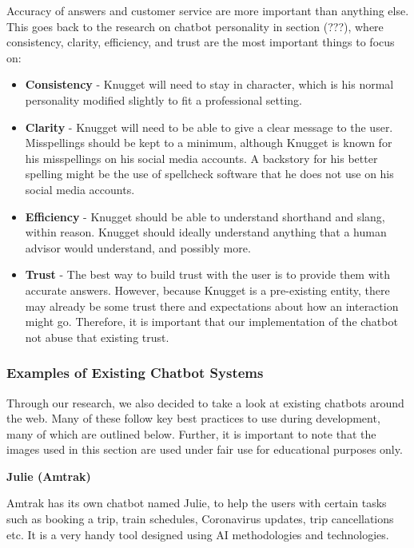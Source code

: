 \documentclass[titlepage, 12pt]{article}
\begin{document}
Accuracy of answers and customer service are more important than anything else. This goes back to the research on chatbot personality in section (???), where consistency, clarity, efficiency, and trust are the most important things to focus on:

\begin{itemize}
    \item \textbf{Consistency} - Knugget will need to stay in character, which is his normal personality modified slightly to fit a professional setting.
    \item \textbf{Clarity} - Knugget will need to be able to give a clear message to the user. Misspellings should be kept to a minimum, although Knugget is known for his misspellings on his social media accounts. A backstory for his better spelling might be the use of spellcheck software that he does not use on his social media accounts.
    \item \textbf{Efficiency} - Knugget should be able to understand shorthand and slang, within reason. Knugget should ideally understand anything that a human advisor would understand, and possibly more.
    \item \textbf{Trust} - The best way to build trust with the user is to provide them with accurate answers. However, because Knugget is a pre-existing entity, there may already be some trust there and expectations about how an interaction might go. Therefore, it is important that our implementation of the chatbot not abuse that existing trust.
\end{itemize}


\subsubsection{Examples of Existing Chatbot Systems}

Through our research, we also decided to take a look at existing chatbots around the web. Many of these follow key best practices to use during development, many of which are outlined below. Further, it is important to note that the images used in this section are used under fair use for educational purposes only.

\textbf{Julie (Amtrak)}

Amtrak has its own chatbot named Julie, to help the users with certain tasks such as booking a trip, train schedules, Coronavirus updates, trip cancellations etc. It is a very handy tool designed using AI methodologies and technologies.
\end{document}
